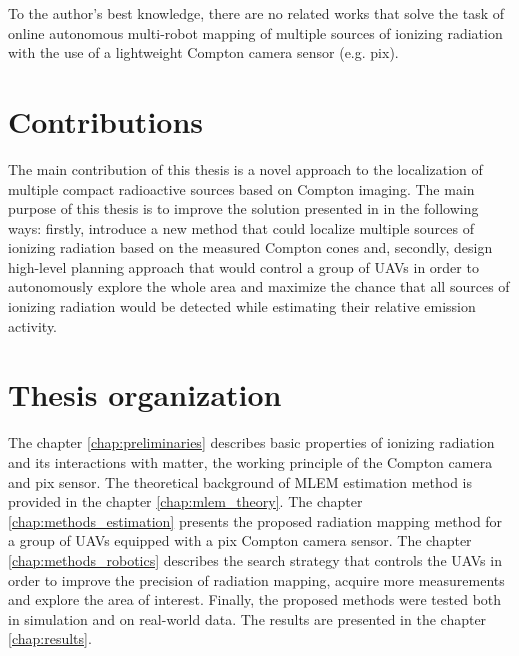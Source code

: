 To the author's best knowledge, there are no related works that solve the task of online autonomous multi-robot mapping of multiple sources of ionizing radiation with the use of a lightweight Compton camera sensor (e.g. \ac{pix}).

\section{Contributions}
The main contribution of this thesis is a novel approach to the localization of multiple compact radioactive sources based on Compton imaging.
The main purpose of this thesis is to improve the solution presented in \cite{baca2021gamma} in the following ways: 
firstly, introduce a new method that could localize multiple sources of ionizing radiation based on the measured Compton cones and, 
secondly, 
design high-level planning approach that would control a group of \ac{UAV}s in order to autonomously explore the whole area and maximize the chance that all sources of ionizing radiation would be detected while estimating their relative emission activity.

\section{Thesis organization}
The chapter \ref{chap:preliminaries} describes basic properties of ionizing radiation and its interactions with matter, the working principle of the Compton camera and \ac{pix} sensor.
The theoretical background of \ac{MLEM} estimation method is provided in the chapter \ref{chap:mlem_theory}.
The chapter \ref{chap:methods_estimation} presents the proposed radiation mapping method for a group of \ac{UAV}s equipped with a \ac{pix} Compton camera sensor.
The chapter \ref{chap:methods_robotics} describes the search strategy that controls the \ac{UAV}s in order to improve the precision of radiation mapping, acquire more measurements and explore the area of interest. 
Finally, the proposed methods were tested both in simulation and on real-world data. 
The results are presented in the chapter \ref{chap:results}.


